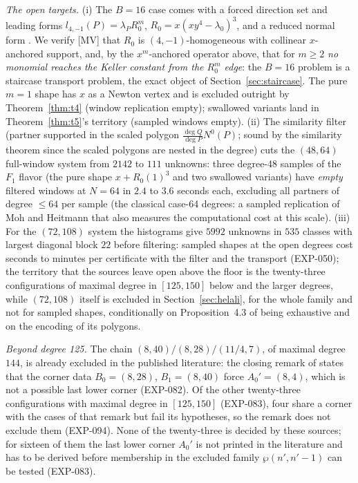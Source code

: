 \documentclass[11pt]{article}
\theoremstyle{remark}
\begin{document}
\emph{The open targets.} (i) The $B = 16$ case comes with a forced direction set and
leading forms $l_{4,-1}(P) = \lambda_P R_0^m$, $R_0 = x (x y^4 - \lambda_0)^3$, and a
reduced normal form \cite{GGV2017}. We verify [MV] that $R_0$ is $(4,-1)$-homogeneous with
collinear $x$-anchored support, and, by the $x^m$-anchored operator above, that for
$m \ge 2$ \emph{no monomial reaches the Keller constant from the $R_0^m$ edge}: the
$B = 16$ problem is a staircase transport problem, the exact object of
Section~\ref{sec:staircase}. The pure $m = 1$ shape has $x$ as a Newton vertex and is
excluded outright by Theorem~\ref{thm:t4} (window replication empty); swallowed variants
land in Theorem~\ref{thm:t5}'s territory (sampled windows empty). (ii) The similarity filter
(partner supported in the scaled polygon $\tfrac{\deg Q}{\deg P} N^0(P)$; sound by the
similarity theorem since the scaled polygons are nested in the degree) cuts the
$(48, 64)$ full-window system from $2142$ to $111$ unknowns: three degree-48 samples of the
$F_1$ flavor (the pure shape $x + R_0(1)^3$ and two swallowed variants) have \emph{empty}
filtered windows at $N = 64$ in $2.4$ to $3.6$ seconds each, excluding all partners of
degree $\le 64$ per sample (the classical case-64 degrees: a sampled replication of Moh and
Heitmann that also measures the computational cost at this scale). (iii) For the $(72, 108)$ system the histograms give $5992$ unknowns
in $535$ classes with largest diagonal block $22$ before filtering: sampled shapes at the open degrees cost seconds to minutes per certificate with the filter and
the transport (EXP-050); the territory that the sources leave open above the floor is the twenty-three configurations of maximal degree in $[125,150]$ below and the larger
degrees, while $(72, 108)$ itself is excluded in Section~\ref{sec:helali}, for the whole family and not for sampled shapes, conditionally on Proposition~4.3 of \cite{GGHV2022} being exhaustive and on the encoding of its polygons.



\emph{Beyond degree 125.} The chain $(8,40)/(8,28)/(11/4,7)$, of maximal degree $144$,
is already excluded in the published literature: the closing remark of \cite{GGV2} states
that the corner data $B_0 = (8,28)$, $B_1 = (8,40)$ force $A_0' = (8,4)$, which is not a
possible last lower corner (EXP-082). Of the other twenty-three configurations with maximal
degree in $[125,150]$ (EXP-083), four share a corner with the cases of that remark but fail its
hypotheses, so the remark does not exclude them (EXP-094). None of the twenty-three is decided
by these sources; for sixteen of them the last lower corner $A_0'$ is not printed in the
literature and has to be derived before membership in the excluded family $\wp(n', n'-1)$ can
be tested (EXP-083).
\end{document}
